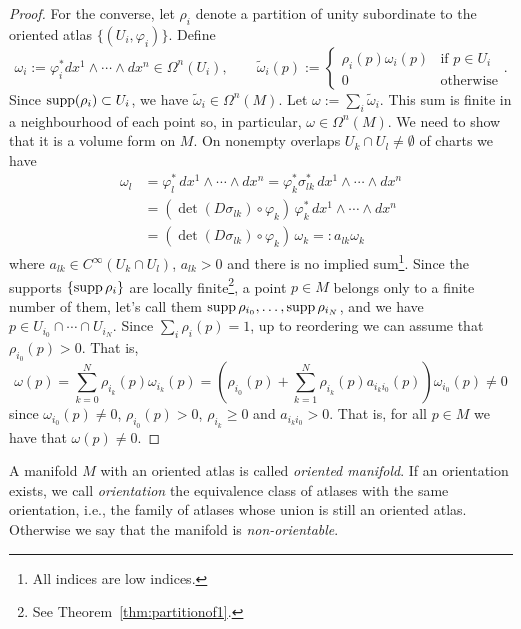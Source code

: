 \begin{proof}
	For the converse, let $\rho_i$ denote a partition of unity subordinate to the oriented atlas $\{(U_i, \varphi_i)\}$.
	Define
	\begin{equation}
		\omega_i := \varphi_i^* dx^1\wedge\cdots\wedge dx^n \in \Omega^n(U_i)
		, \qquad
		\widetilde \omega_i(p) := \begin{cases}
			\rho_i(p)\omega_i(p) & \mbox{if } p\in U_i \\
			0                    & \mbox{otherwise}
		\end{cases}.
	\end{equation}
	Since $\operatorname{supp}(\rho_i) \subset U_i$, we have $\widetilde\omega_i\in\Omega^n(M)$.
	Let $\omega := \sum_i \widetilde \omega_i$. This sum is finite in a neighbourhood of each point so, in particular, $\omega \in \Omega^n(M)$. We need to show that it is a volume form on $M$.
	On nonempty overlaps $U_k \cap U_l \neq \emptyset$ of charts we have
	\begin{align}
		\omega_l & = \varphi_l^*\, dx^1\wedge\cdots\wedge dx^n = \varphi_k^* \sigma_{lk}^*\, dx^1 \wedge\cdots\wedge dx^n \\
		         & = (\det(D\sigma_{lk})\circ \varphi_k)\, \varphi^*_k\, dx^1\wedge\cdots\wedge dx^n                   \\
		         & = (\det(D\sigma_{lk})\circ \varphi_k)\, \omega_k =: a_{lk} \omega_k \label{form:cov}
	\end{align}
	where $a_{lk}\in C^{\infty}(U_k\cap U_l)$, $a_{lk} > 0$ and there is no implied sum\footnote{All indices are low indices.}.
	Since the supports $\{\operatorname{supp}\rho_i\}$ are locally finite\footnote{See Theorem~\ref{thm:partitionof1}.}, a point $p\in M$ belongs only to a finite number of them, let's call them $\operatorname{supp}\rho_{i_0}, \ldots, \operatorname{supp}\rho_{i_N}$, and we have $p\in U_{i_0}\cap\cdots\cap U_{i_N}$. Since $\sum_i\rho_i(p) = 1$, up to reordering we can assume that $\rho_{i_0}(p)>0$. That is,
	\begin{equation}
		\omega(p) = \sum_{k=0}^N \rho_{i_k}(p)\omega_{i_k}(p) = \left( \rho_{i_0}(p) + \sum_{k = 1}^N \rho_{i_k}(p) a_{i_k i_0}(p) \right) \omega_{i_0}(p) \neq 0
	\end{equation}
	since $\omega_{i_0}(p) \neq 0$, $\rho_{i_0}(p)>0$, $\rho_{i_k}\geq 0$ and $a_{i_k i_0} > 0$.
	That is, for all $p\in M$ we have that $\omega(p) \neq 0$.
\end{proof}


\begin{definition}
	A manifold $M$ with an oriented atlas is called \emph{oriented manifold}.
	If an orientation exists, we call \emph{orientation} the equivalence class of atlases with the same orientation, i.e., the family of atlases whose union is still an oriented atlas.
	Otherwise we say that the manifold is \emph{non-orientable}.
\end{definition}

